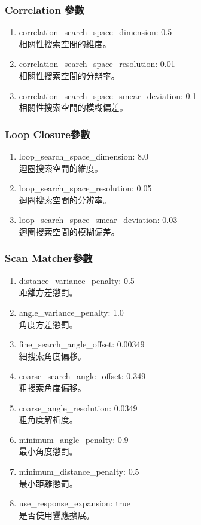 \subsubsection{ Correlation 參數}
\begin{enumerate}
    \item correlation\_search\_space\_dimension: 0.5
    \\相關性搜索空間的維度。
    \item correlation\_search\_space\_resolution: 0.01
    \\相關性搜索空間的分辨率。
    \item correlation\_search\_space\_smear\_deviation: 0.1
    \\相關性搜索空間的模糊偏差。
\end{enumerate}
\subsubsection{ Loop Closure參數}
\begin{enumerate}
    \item loop\_search\_space\_dimension: 8.0
    \\迴圈搜索空間的維度。
    \item loop\_search\_space\_resolution: 0.05
    \\迴圈搜索空間的分辨率。
    \item loop\_search\_space\_smear\_deviation: 0.03
    \\迴圈搜索空間的模糊偏差。
\end{enumerate}
\subsubsection{ Scan Matcher參數}
\begin{enumerate}
    \item distance\_variance\_penalty: 0.5
    \\距離方差懲罰。
    \item angle\_variance\_penalty: 1.0
    \\角度方差懲罰。
    \item fine\_search\_angle\_offset: 0.00349
    \\細搜索角度偏移。
    \item coarse\_search\_angle\_offset: 0.349
    \\粗搜索角度偏移。
    \item coarse\_angle\_resolution: 0.0349
    \\粗角度解析度。
    \item minimum\_angle\_penalty: 0.9
    \\最小角度懲罰。
    \item minimum\_distance\_penalty: 0.5
    \\最小距離懲罰。
    \item use\_response\_expansion: true
    \\是否使用響應擴展。
\end{enumerate}
